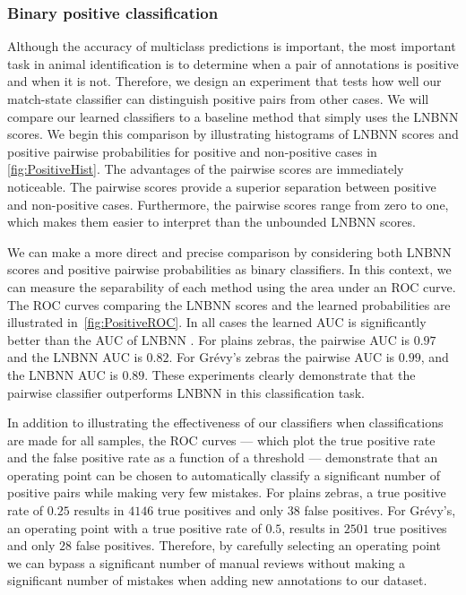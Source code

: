         \ReRank{}
        
        \FloatBarrier{}
        \subsubsection{Binary positive classification}
        Although the accuracy of multiclass predictions is important, the most important task in animal
          identification is to determine when a pair of annotations is positive and when it is not.
        Therefore, we design an experiment that tests how well our match-state classifier can distinguish
          positive pairs from other cases.
        We will compare our learned classifiers to a baseline method that simply uses the LNBNN scores.
        We begin this comparison by illustrating histograms of LNBNN scores and positive pairwise probabilities
          for positive and non-positive cases in \cref{fig:PositiveHist}.
        The advantages of the pairwise scores are immediately noticeable.
        The pairwise scores provide a superior separation between positive and non-positive cases.
        Furthermore, the pairwise scores range from zero to one, which makes them easier to interpret than the
          unbounded LNBNN scores.

        We can make a more direct and precise comparison by considering both LNBNN scores and positive pairwise
          probabilities as binary classifiers.
        In this context, we can measure the separability of each method using the area under an ROC curve.
        The ROC curves comparing the LNBNN scores and the learned probabilities are illustrated
          in~\cref{fig:PositiveROC}.
        In all cases the learned AUC is significantly better than the AUC of LNBNN .
        For plains zebras, the pairwise AUC is $0.97$ and the LNBNN AUC is $0.82$.
        For Grévy's zebras the pairwise AUC is $0.99$, and the LNBNN AUC is $0.89$.
        These experiments clearly demonstrate that the pairwise classifier outperforms LNBNN in this
          classification task.

        In addition to illustrating the effectiveness of our classifiers when classifications are made for all
          samples, the ROC curves --- which plot the true positive rate and the false positive rate as a function
          of a threshold --- demonstrate that an operating point can be chosen to automatically classify a
          significant number of positive pairs while making very few mistakes.
        For plains zebras, a true positive rate of $0.25$ results in $4146$ true positives and only $38$ false
          positives.
        For Grévy's, an operating point with a true positive rate of $0.5$, results in $2501$ true positives and
          only $28$ false positives.
        Therefore, by carefully selecting an operating point we can bypass a significant number of manual reviews
          without making a significant number of mistakes when adding new annotations to our dataset.


